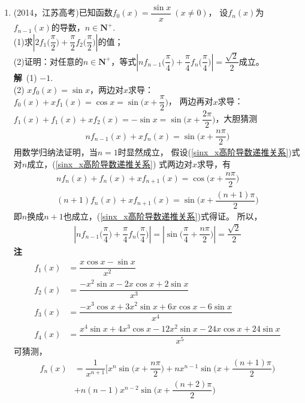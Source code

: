 \begin{enumerate}[label={【\textbf{例\thechapter.\arabic*}】},
 leftmargin=\inteval{\myenumleftmargin}pt,
 itemsep=\inteval{\myenumitempsep}pt,
 itemindent=\inteval{\myenumitemindent}pt]
\item (2014，江苏高考)已知函数$f_{0}(x)=\dfrac{\sin x}{x}\ (x\neq 0)$，
设$f_{n}(x)$为$f_{n-1}(x)$的导数，$n\in \textbf{N}^{+}$. \\
(1)求$ \left|2f_{1}\Big(\dfrac{\pi}{2}\Big)+
\dfrac{\pi}{2}f_{2}\Big(\dfrac{\pi}{2}\Big)\right| $的值；\\
(2)证明：对任意的$n\in \textbf{N}^{+}$，等式$\left|nf_{n-1}
\Big(\dfrac{\pi}{4}\Big)+\dfrac{\pi}{4}f_{n}
\Big(\dfrac{\pi}{4}\Big)\right|=\dfrac{\sqrt{2}}{2}$成立。\\
\textbf{解}\ (1) $ -1 $. \\
(2) $ xf_0(x)=\sin x $，两边对$ x $求导：$ f_0(x)+xf_1(x)=\cos x=
\sin\Big(x+\dfrac{\pi}{2}\Big) $，
两边再对$ x $求导：$ f_1(x)+f_1(x)+xf_2(x)=-\sin x=
\sin\Big(x+\dfrac{2\pi}{2}\Big) $，大胆猜测
\begin{gather}\label{sinx_x高阶导数递推关系}
    nf_{n-1}(x)+xf_{n}(x)=\sin\Big(x+\dfrac{n\pi}{2}\Big)
\end{gather}
用数学归纳法证明，当$ n=1 $时显然成立，
假设(\ref{sinx_x高阶导数递推关系})式对$ n $成立，(\ref{sinx_x高阶导数递推关系})
式两边对$ x $求导，有
\begin{gather*}
    nf_{n}(x)+f_n(x)+xf_{n+1}(x)=\cos\Big(x+\dfrac{n\pi}{2}\Big) \\
    (n+1)f_n(x)+xf_{n+1}(x)=\sin\Big(x+\dfrac{(n+1)\pi}{2}\Big)
\end{gather*}
即$ n $换成$ n+1 $也成立，(\ref{sinx_x高阶导数递推关系})式得证。
所以，
\begin{gather*}
    \left|nf_{n-1}\Big(\dfrac{\pi}{4}\Big)+\dfrac{\pi}{4}f_{n}
    \Big(\dfrac{\pi}{4}\Big)\right|=\left|\sin\Big(\dfrac{\pi}{4}
    +\dfrac{n\pi}{2}\Big)\right|=\dfrac{\sqrt{2}}{2}
\end{gather*}
\textbf{注}\ 
\begin{align*}
    f_1(x) &=\dfrac{x\cos x-\sin x}{x^2}  \\
    f_2(x) &=\dfrac{-x^{2}\sin x-2x\cos x+2\sin x}{x^3}  \\
    f_3(x) &=\dfrac{-x^{3}\cos x+3x^{2}\sin x+6x\cos x-6\sin x}{x^4}  \\
    f_4(x) &=\dfrac{x^{4}\sin x+4x^{3}\cos x-12x^{2}\sin x-24x\cos x+
        24\sin x}{x^5}
\end{align*}
可猜测，
\begin{align*}
    f_n(x) &=\dfrac{1}{x^{n+1}}\Bigg[x^{n}\sin \Big(x+\dfrac{n\pi}{2}\Big)+
    nx^{n-1}\sin \Big(x+\dfrac{(n+1)\pi}{2}\Big)  \\
    & + n(n-1)x^{n-2}\sin \Big(x+\dfrac{(n+2)\pi}{2}\Big)

\end{align*}
\end{enumerate}
